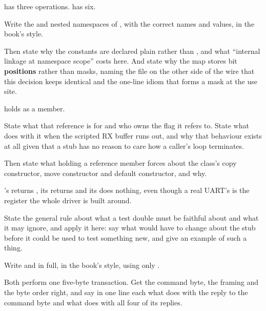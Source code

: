  has three operations.  has six.

 Write the  and  nested namespaces of
, with the correct names and values, in the book's style.

Then state why the constants are declared plain  rather than
, and what ``internal linkage at namespace scope'' costs here. And state why
the map stores bit \textbf{positions} rather than masks, naming the file on the other side of the
wire that this decision keeps identical and the one-line idiom that forms a mask at the use site.

  holds  as a member.

State what that reference is for and who owns the flag it refers to. State what  does
with it when the scripted RX buffer runs out, and why that behaviour exists at all given that a stub
has no reason to care how a caller's loop terminates.

Then state what holding a reference member forces about the class's copy constructor, move
constructor and default constructor, and why. 

 's  returns , its 
returns  and its  does nothing, even though a real UART's 
is the register the whole driver is built around.

State the general rule about what a test double must be faithful about and what it may ignore, and
apply it here: say what would have to change about the stub before it could be used to test
something new, and give an example of such a thing. 

\label{exb:q:6}

 Write  and
 in full, in the book's style, using only
.

Both perform one five-byte transaction. Get the command byte, the framing and the byte order right,
and say in one line each what  does with the reply to the command byte and what
 does with all four of its replies.

